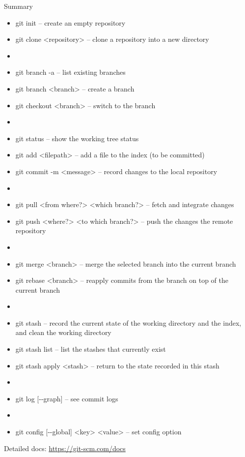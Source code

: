 \begin{frame}{Summary}
	\begin{tiny}
    \begin{itemize}
        \item[] {\color{eclipseBlue}git init} -- create an empty repository
        \item[] {\color{eclipseBlue}git clone <repository>} -- clone a repository into a new directory
        \item[]
        \item[] {\color{eclipseBlue}git branch -a} -- list existing branches
        \item[] {\color{eclipseBlue}git branch <branch>} -- create a branch
        \item[] {\color{eclipseBlue}git checkout <branch>} -- switch to the branch 
        \item[]
        \item[] {\color{eclipseBlue}git status} -- show the working tree status
        \item[] {\color{eclipseBlue}git add <filepath>} -- add a file to the index (to be committed)
        \item[] {\color{eclipseBlue}git commit -m <message>} -- record changes to the local repository
        \item[]
        \item[] {\color{eclipseBlue}git pull <from where?> <which branch?>} -- fetch and integrate changes
        \item[] {\color{eclipseBlue}git push <where?> <to which branch?>} -- push the changes the remote repository
        \item[]
        \item[] {\color{eclipseBlue}git merge <branch>} -- merge the selected branch into the current branch
        \item[] {\color{eclipseBlue}git rebase <branch>} -- reapply commits from the branch on top of the current branch
        \item[]
        \item[] {\color{eclipseBlue}git stash} -- record the current state of the working directory and the index, and clean the working directory
        \item[] {\color{eclipseBlue}git stash list} -- list the stashes that currently exist
        \item[] {\color{eclipseBlue}git stash apply <stash>} -- return to the state recorded in this stash
        \item[]
        \item[] {\color{eclipseBlue}git log [-{}-graph]} -- see commit logs
        \item[]
        \item[] {\color{eclipseBlue}git config [-{}-global] <key> <value>} -- set config option
    \end{itemize}
    
    \begin{center}
    	Detailed docs: \url{https://git-scm.com/docs}
    \end{center}
    \end{tiny}
\end{frame}
